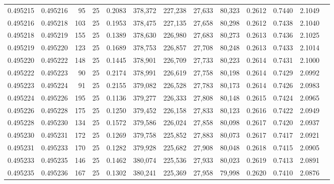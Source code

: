 \begin{tabular}{rrrrrrrrrrrrr}
0.495215 & 0.495216 &    95 &  25 &                                     0.2083 & 378,372 & 227,238 &  27,633 &  80,323 & 0.2612 & 0.7440 & 2.1049 \\
0.495216 & 0.495218 &   103 &  25 &                                     0.1953 & 378,475 & 227,135 &  27,658 &  80,298 & 0.2612 & 0.7438 & 2.1040 \\
0.495218 & 0.495219 &   155 &  25 &                                     0.1389 & 378,630 & 226,980 &  27,683 &  80,273 & 0.2613 & 0.7436 & 2.1025 \\
0.495219 & 0.495220 &   123 &  25 &                                     0.1689 & 378,753 & 226,857 &  27,708 &  80,248 & 0.2613 & 0.7433 & 2.1014 \\
0.495220 & 0.495222 &   148 &  25 &                                     0.1445 & 378,901 & 226,709 &  27,733 &  80,223 & 0.2614 & 0.7431 & 2.1000 \\
0.495222 & 0.495223 &    90 &  25 &                                     0.2174 & 378,991 & 226,619 &  27,758 &  80,198 & 0.2614 & 0.7429 & 2.0992 \\
0.495223 & 0.495224 &    91 &  25 &                                     0.2155 & 379,082 & 226,528 &  27,783 &  80,173 & 0.2614 & 0.7426 & 2.0983 \\
0.495224 & 0.495226 &   195 &  25 &                                     0.1136 & 379,277 & 226,333 &  27,808 &  80,148 & 0.2615 & 0.7424 & 2.0965 \\
0.495226 & 0.495228 &   175 &  25 &                                     0.1250 & 379,452 & 226,158 &  27,833 &  80,123 & 0.2616 & 0.7422 & 2.0949 \\
0.495228 & 0.495230 &   134 &  25 &                                     0.1572 & 379,586 & 226,024 &  27,858 &  80,098 & 0.2617 & 0.7420 & 2.0937 \\
0.495230 & 0.495231 &   172 &  25 &                                     0.1269 & 379,758 & 225,852 &  27,883 &  80,073 & 0.2617 & 0.7417 & 2.0921 \\
0.495231 & 0.495233 &   170 &  25 &                                     0.1282 & 379,928 & 225,682 &  27,908 &  80,048 & 0.2618 & 0.7415 & 2.0905 \\
0.495233 & 0.495235 &   146 &  25 &                                     0.1462 & 380,074 & 225,536 &  27,933 &  80,023 & 0.2619 & 0.7413 & 2.0891 \\
0.495235 & 0.495236 &   167 &  25 &                                     0.1302 & 380,241 & 225,369 &  27,958 &  79,998 & 0.2620 & 0.7410 & 2.0876 \\

\end{tabular}
